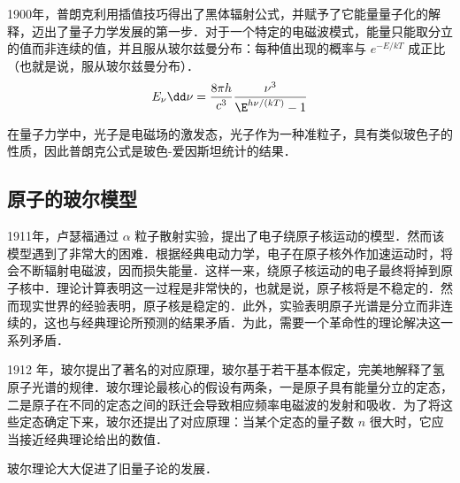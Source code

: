 1900年，普朗克利用插值技巧得出了黑体辐射公式，并赋予了它能量量子化的解释，迈出了量子力学发展的第一步．对于一个特定的电磁波模式，能量只能取分立的值而非连续的值，并且服从玻尔兹曼分布：每种值出现的概率与 $e^{-E/kT}$ 成正比（也就是说，服从玻尔兹曼分布）．
\begin{equation}
E_\nu \dd \nu=\frac{8\pi h}{c^3}\frac{\nu^3}{\E^{h\nu/(k T)} - 1}
\end{equation}

在量子力学中，光子是电磁场的激发态，光子作为一种准粒子，具有类似玻色子的性质，因此普朗克公式是玻色-爱因斯坦统计的结果．

\subsection{原子的玻尔模型}
1911年，卢瑟福通过 $\alpha$ 粒子散射实验，提出了电子绕原子核运动的模型．然而该模型遇到了非常大的困难．根据经典电动力学，电子在原子核外作加速运动时，将会不断辐射电磁波，因而损失能量．这样一来，绕原子核运动的电子最终将掉到原子核中．理论计算表明这一过程是非常快的，也就是说，原子核将是不稳定的．然而现实世界的经验表明，原子核是稳定的．此外，实验表明原子光谱是分立而非连续的，这也与经典理论所预测的结果矛盾．为此，需要一个革命性的理论解决这一系列矛盾．

1912 年，玻尔提出了著名的对应原理，玻尔基于若干基本假定，完美地解释了氢原子光谱的规律．玻尔理论最核心的假设有两条，一是原子具有能量分立的定态，二是原子在不同的定态之间的跃迁会导致相应频率电磁波的发射和吸收．为了将这些定态确定下来，玻尔还提出了对应原理：当某个定态的量子数 $n$ 很大时，它应当接近经典理论给出的数值．

玻尔理论大大促进了旧量子论的发展．